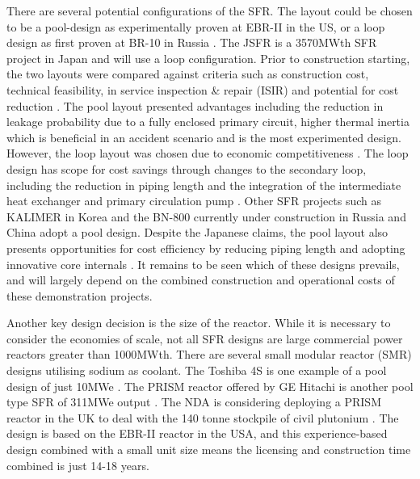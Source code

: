 \documentclass[journal]{IEEEtran}
\begin{document}
There are several potential configurations of the SFR. 
The layout could be chosen to be a pool-design as experimentally proven at EBR-II in the US, or a loop design as first proven at BR-10 in Russia \cite{Int2012}. 
The JSFR is a 3570MWth SFR project in Japan and will use a loop configuration. 
Prior to construction starting, the two layouts were compared against criteria such as construction cost, technical feasibility, in service inspection \& repair (ISIR) and potential for cost reduction \cite{Sakamoto2013194}.
The pool layout presented advantages including the reduction in leakage probability due to a fully enclosed primary circuit, higher thermal inertia which is beneficial in an accident scenario and is the most experimented design.
However, the loop layout was chosen due to economic competitiveness \cite{Locatelli2013}. 
The loop design has scope for cost savings through changes to the secondary loop, including the reduction in piping length and the integration of the intermediate heat exchanger and primary circulation pump \cite{Sakamoto2013194}. 
Other SFR projects such as KALIMER in Korea and the BN-800 currently under construction in Russia and China adopt a pool design. 
Despite the Japanese claims, the pool layout also presents opportunities for cost efficiency by reducing piping length and adopting innovative core internals \cite{Locatelli2013}. 
It remains to be seen which of these designs prevails, and will largely depend on the combined construction and operational costs of these demonstration projects.

Another key design decision is the size of the reactor. 
While it is necessary to consider the economies of scale, not all SFR designs are large commercial power reactors greater than 1000MWth.
There are several small modular reactor (SMR) designs utilising sodium as coolant.
The Toshiba 4S is one example of a pool design of just 10MWe \cite{Locatelli2013}. 
The PRISM reactor offered by GE Hitachi is another pool type SFR of 311MWe output \cite{Locatelli2013}. 
The NDA is considering deploying a PRISM reactor in the UK to deal with the 140 tonne stockpile of civil plutonium \cite{NDA14}. 
The design is based on the EBR-II reactor in the USA, and this experience-based design combined with a small unit size means the licensing and construction time combined is just 14-18 years\cite{NDA14}.
\end{document}
